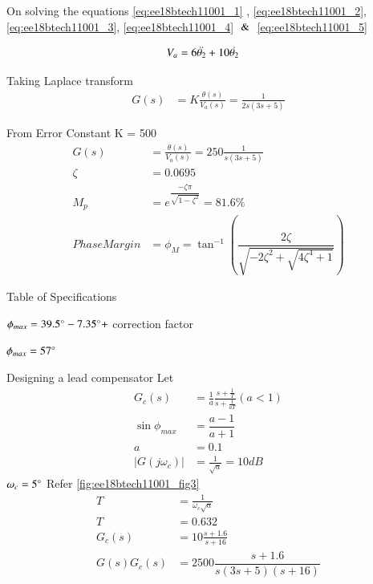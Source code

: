 On solving the equations \eqref{eq:ee18btech11001_1} , \eqref{eq:ee18btech11001_2}, \eqref{eq:ee18btech11001_3}, \eqref{eq:ee18btech11001_4} $\And$ \eqref{eq:ee18btech11001_5}

\begin{align}
    V_{a} &= 6\Ddot{\theta_{2}} + 10\Dot{\theta_{2}} \label{eq:ee18btech11001_6}
\end{align}

Taking Laplace transform
\begin{align}
   G(s) &=  K \frac{\theta (s)}{V_{a}(s)} = \frac{1}{2s(3s+5)} \label{eq:ee18btech11001_7}
\end{align}

From Error Constant  K = 500
\begin{align}
   G(s) &=  \frac{\theta (s)}{V_{a}(s)} = 250 \frac{1}{s(3s+5)} \label{eq:ee18btech11001_8}
   \\
   \zeta &= 0.0695
   \\
   M_{p} &= e^{\dfrac{-\zeta\pi}{\sqrt{1-\zeta^{2}}}} = 81.6\%
   \\
   Phase Margin &= \phi_{M} = \tan^{-1}(\dfrac{2\zeta}{\sqrt{-2\zeta^2 + \sqrt{4\zeta^4 + 1}}})
\end{align}

\begin{table}[!ht]
\centering

\caption{Table of Specifications}
\label{table:ee18btech11001}
\end{table}

$\phi_{max} = 39.5\degree-7.35\degree+$ correction factor

$\phi_{max} = 57\degree$

Designing a lead compensator
Let 
\begin{align}
   G_{c}(s) &=  \frac{1}{a}\frac{s + \frac{1}{T}}{s + \frac{1}{aT}} (a<1) \label{eq:ee18btech11001_9}
   \\
   \sin\phi_{max} &= \dfrac{a-1}{a+1}
   \\
   a &= 0.1
   \\
   |G(j\omega_{c})| &= \frac{1}{\sqrt{a}} = 10 dB
\end{align}
$\omega_{c} = 5\degree$ Refer \ref{fig:ee18btech11001_fig3}
\begin{align}
   T &= \frac{1}{\omega_{c}\sqrt{a}}
   \\
   T &= 0.632
   \\
   G_{c}(s) &=  10 \frac{s + 1.6}{s + 16}
   \\
   G(s)G_{c}(s)  &= 2500 \dfrac{s+1.6}{s(3s+5)(s+16)} \label{eq:ee18btech11001_10}
\end{align}

